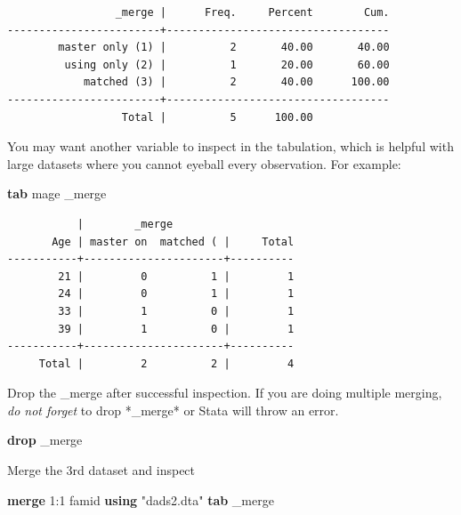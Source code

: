 \documentclass[
]{book}
\newenvironment{Shaded}{\begin{snugshade}}{\end{snugshade}}
\newcommand{\DataTypeTok}[1]{\textcolor[rgb]{0.13,0.29,0.53}{#1}}
\newcommand{\KeywordTok}[1]{\textcolor[rgb]{0.13,0.29,0.53}{\textbf{#1}}}
\newcommand{\NormalTok}[1]{#1}
\newcommand{\StringTok}[1]{\textcolor[rgb]{0.31,0.60,0.02}{#1}}
\begin{document}
\begin{verbatim}
                 _merge |      Freq.     Percent        Cum.
------------------------+-----------------------------------
        master only (1) |          2       40.00       40.00
         using only (2) |          1       20.00       60.00
            matched (3) |          2       40.00      100.00
------------------------+-----------------------------------
                  Total |          5      100.00
\end{verbatim}

You may want another variable to inspect in the tabulation, which is helpful with large datasets where you cannot eyeball every observation.
For example:

\begin{Shaded}
\begin{Highlighting}[]
\KeywordTok{tab}\NormalTok{ mage }\DataTypeTok{\_merge}
\end{Highlighting}
\end{Shaded}

\begin{verbatim}
           |        _merge
       Age | master on  matched ( |     Total
-----------+----------------------+----------
        21 |         0          1 |         1 
        24 |         0          1 |         1 
        33 |         1          0 |         1 
        39 |         1          0 |         1 
-----------+----------------------+----------
     Total |         2          2 |         4 
\end{verbatim}

Drop the \_merge after successful inspection. If you are doing multiple merging, \emph{do not forget} to drop *\_merge* or Stata will throw an error.

\begin{Shaded}
\begin{Highlighting}[]
\KeywordTok{drop} \DataTypeTok{\_merge}
\end{Highlighting}
\end{Shaded}

Merge the 3rd dataset and inspect

\begin{Shaded}
\begin{Highlighting}[]
\KeywordTok{merge}\NormalTok{ 1:1 famid }\KeywordTok{using} \StringTok{"dads2.dta"}
\KeywordTok{tab} \DataTypeTok{\_merge}
\end{Highlighting}
\end{Shaded}
\end{document}
